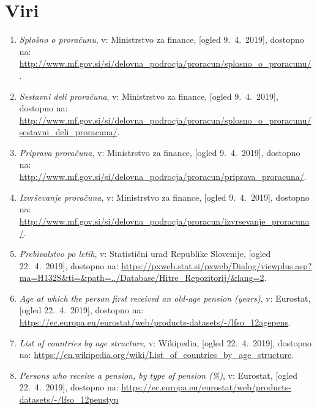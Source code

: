 \documentclass[12pt, a4paper]{article}
\begin{document}
\section[Viri]{Viri}
\begin{enumerate}
\item
\label{Splošno o proračunu}
\emph{Splošno o proračunu}, v: Ministrstvo za finance, [ogled 9.~4.~2019], dostopno na: \url{http://www.mf.gov.si/si/delovna_podrocja/proracun/splosno_o_proracunu/}.

\item
\label{Sestavni deli}
\emph{Sestavni deli proračuna}, v: Ministrstvo za finance, [ogled 9.~4.~2019], dostopno na: \url{http://www.mf.gov.si/si/delovna_podrocja/proracun/splosno_o_proracunu/sestavni_deli_proracuna/}.

\item
\label{Priprava proračuna}
\emph{Priprava proračuna}, v: Ministrstvo za finance, [ogled 9.~4.~2019], dostopno na: \url{http://www.mf.gov.si/si/delovna_podrocja/proracun/priprava_proracuna/}.

\item
\label{Izvrševanje proračuna}
\emph{Izvrševanje proračuna}, v: Ministrstvo za finance, [ogled 9.~4.~2019], dostopno na: \url{http://www.mf.gov.si/si/delovna_podrocja/proracun/izvrsevanje_proracuna/}.

\item
\label{Prebivalstvo Slovenije}
\emph{Prebivalstvo po letih}, v: Statistični urad Republike Slovenije, [ogled 22.~4.~2019], dostopno na: \url{https://pxweb.stat.si/pxweb/Dialog/viewplus.asp?ma=H132S&ti=&path=../Database/Hitre_Repozitorij/&lang=2}.

\item
\label{Eurostat pokojnine}
\emph{Age at which the person first received an old-age pension (years)}, v: Eurostat, [ogled 22.~4.~2019], dostopno na: \url{https://ec.europa.eu/eurostat/web/products-datasets/-/lfso_12agepens}.

\item
\label{Struktura prebivalstva}
\emph{List of countries by age structure}, v: Wikipedia, [ogled 22.~4.~2019], dostopno na: \url{https://en.wikipedia.org/wiki/List_of_countries_by_age_structure}.

\item
\label{Eurostat pokojnine procentualno}
\emph{Persons who receive a pension, by type of pension (\%)}, v: Eurostat, [ogled 22.~4.~2019], dostopno na: \url{https://ec.europa.eu/eurostat/web/products-datasets/-/lfso_12penstyp}


\end{enumerate}
\end{document}
